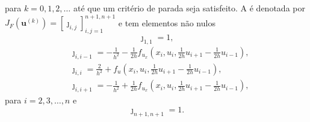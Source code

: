 para $k = 0, 1, 2, \ldots$ até que um critério de parada seja satisfeito. A  é denotada por $J_{F}\left(\pmb{u}^{(k)}\right) = [\jmath_{i,j}]_{i,j=1}^{n+1,n+1}$ e tem elementos não nulos
\begin{equation}
  \jmath_{1,1} = 1,
\end{equation}
\begin{subequations}
  \begin{align}
    &\jmath_{i,i-1} = -\frac{1}{h^2} - \frac{1}{2h}f_{u_x}\left(x_i, u_i, \frac{1}{2h}u_{i+1}-\frac{1}{2h}u_{i-1}\right),\\
    &\jmath_{i,i} = \frac{2}{h^2} + f_{u}\left(x_i, u_i, \frac{1}{2h}u_{i+1}-\frac{1}{2h}u_{i-1}\right),\\
    &\jmath_{i,i+1} = -\frac{1}{h^2} + \frac{1}{2h}f_{u_x}\left(x_i, u_i, \frac{1}{2h}u_{i+1}-\frac{1}{2h}u_{i-1}\right),
  \end{align}
\end{subequations}
para $i = 2, 3, \dotsc, n$ e
\begin{equation}
  \jmath_{n+1,n+1} = 1.
\end{equation}

